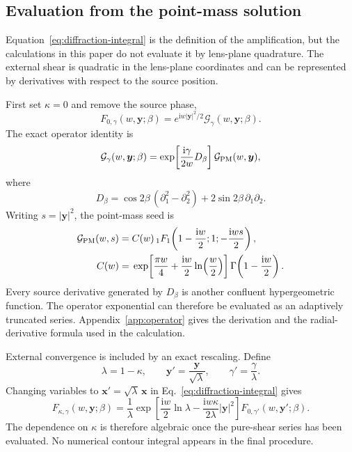 \documentclass[aps,prd,twocolumn,nofootinbib,superscriptaddress,floatfix]{revtex4-2}
\newcommand{\ii}{\mathrm{i}}
\newcommand{\bx}{\bm{x}}
\newcommand{\by}{\bm{y}}
\newcommand{\cG}{\mathcal{G}}
\begin{document}
\subsection{Evaluation from the point-mass solution}
\label{sec:operator-total}

Equation~\eqref{eq:diffraction-integral} is the definition of the
amplification, but the calculations in this paper do not evaluate it by
lens-plane quadrature.  The external shear is quadratic in the lens-plane
coordinates and can be represented by derivatives with respect to the source
position.

First set $\kappa=0$ and remove the source phase,
\begin{equation}
 F_{0,\gamma}(w,\by;\beta)
 =e^{\ii w|\by|^2/2}\cG_{\gamma}(w,\by;\beta).
 \label{eq:G-definition}
\end{equation}
The exact operator identity is
\begin{equation}
 \cG_{\gamma}(w,\by;\beta)
 =\exp\!\left[\frac{\ii\gamma}{2w}D_\beta\right]
  \cG_{\rm PM}(w,\by),
 \label{eq:operator-identity}
\end{equation}
where
\begin{equation}
 D_\beta=
 \cos 2\beta\,(\partial_1^2-\partial_2^2)
 +2\sin 2\beta\,\partial_1\partial_2.
 \label{eq:D-beta}
\end{equation}
Writing $s=|\by|^2$, the point-mass seed is
\begin{align}
 \cG_{\rm PM}(w,s)
 ={}&C(w)\,{}_1F_1\!\left(1-\frac{\ii w}{2};1;
                  -\frac{\ii ws}{2}\right),
 \label{eq:point-mass-seed}\\
 C(w)={}&
 \exp\!\left[\frac{\pi w}{4}
 +\frac{\ii w}{2}\ln\!\left(\frac{w}{2}\right)\right]
 \Gamma\!\left(1-\frac{\ii w}{2}\right).
 \label{eq:point-mass-prefactor}
\end{align}
Every source derivative generated by $D_\beta$ is another confluent
hypergeometric function.  The operator exponential can therefore be evaluated
as an adaptively truncated series.  Appendix~\ref{app:operator} gives the
derivation and the radial-derivative formula used in the calculation.

External convergence is included by an exact rescaling.  Define
\begin{equation}
 \lambda=1-\kappa,
 \qquad
 \by'=\frac{\by}{\sqrt{\lambda}},
 \qquad
 \gamma'=\frac{\gamma}{\lambda}.
 \label{eq:mass-sheet-vars}
\end{equation}
Changing variables to $\bx'=\sqrt{\lambda}\,\bx$ in
Eq.~\eqref{eq:diffraction-integral} gives
\begin{equation}
 F_{\kappa,\gamma}(w,\by;\beta)
 =\frac{1}{\lambda}
 \exp\!\left[
  \frac{\ii w}{2}\ln\lambda
  -\frac{\ii w\kappa}{2\lambda}|\by|^2
 \right]
 F_{0,\gamma'}(w,\by';\beta).
 \label{eq:mass-sheet-map}
\end{equation}
The dependence on $\kappa$ is therefore algebraic once the pure-shear series
has been evaluated.  No numerical contour integral appears in the final
procedure.
\end{document}
